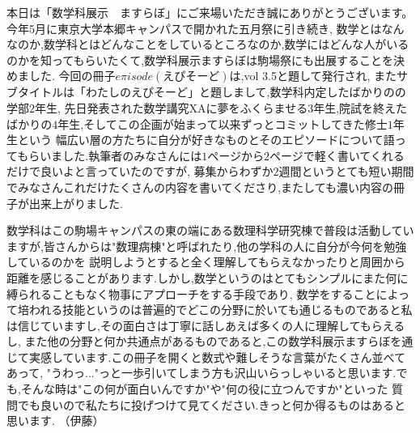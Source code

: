 本日は「数学科展示　ますらぼ」にご来場いただき誠にありがとうございます。今年5月に東京大学本郷キャンパスで開かれた五月祭に引き続き,
数学とはなんなのか,数学科とはどんなことをしているところなのか,数学にはどんな人がいるのかを知ってもらいたくて,数学科展示ますらぼは駒場祭にも出展することを決めました.
今回の冊子$e\pi isode$$(えぴそーど)$は,vol 3.5と題して発行され, またサブタイトルは「わたしのえぴそーど」と題しまして,数学科内定したばかりのの学部$2$年生,
先日発表された数学講究XAに夢をふくらませる$3$年生,院試を終えたばかりの$4$年生,そしてこの企画が始まって以来ずっとコミットしてきた修士$1$年生という
幅広い層の方たちに自分が好きなものとそのエピソードについて語ってもらいました.執筆者のみなさんには$1$ページから$2$ページで軽く書いてくれるだけで良いよと言っていたのですが,
募集からわずか$2$週間というとても短い期間でみなさんこれだけたくさんの内容を書いてくださり,またしても濃い内容の冊子が出来上がりました.\par
数学科はこの駒場キャンパスの東の端にある数理科学研究棟で普段は活動していますが,皆さんからは"数理病棟"と呼ばれたり,他の学科の人に自分が今何を勉強しているのかを
説明しようとすると全く理解してもらえなかったりと周囲から距離を感じることがあります.しかし,数学というのはとてもシンプルにまた何に縛られることもなく物事にアプローチをする手段であり,
数学をすることによって培われる技能というのは普遍的でどこの分野に於いても通じるものであると私は信じていますし,その面白さは丁寧に話しあえば多くの人に理解してもらえるし,
また他の分野と何か共通点があるものであると,この数学科展示ますらぼを通じて実感しています.この冊子を開くと数式や難しそうな言葉がたくさん並べてあって,
"うわっ..."っと一歩引いてしまう方も沢山いらっしゃいると思います.でも,そんな時は"この何が面白いんですか"や"何の役に立つんですか"といった
質問でも良いので私たちに投げつけて見てください.きっと何か得るものはあると思います.
（伊藤）
